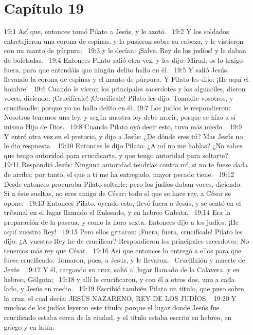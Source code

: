 \section*{Capítulo 19 }

19:1 Así que, entonces tomó Pilato a Jesús, y le azotó.  
19:2 Y los soldados entretejieron una corona de espinas, y la pusieron sobre su cabeza, y le vistieron con un manto de púrpura;  
19:3 y le decían: ¡Salve, Rey de los judíos! y le daban de bofetadas.  
19:4 Entonces Pilato salió otra vez, y les dijo: Mirad, os lo traigo fuera, para que entendáis que ningún delito hallo en él.  
19:5 Y salió Jesús, llevando la corona de espinas y el manto de púrpura. Y Pilato les dijo: ¡He aquí el hombre!  
19:6 Cuando le vieron los principales sacerdotes y los alguaciles, dieron voces, diciendo: ¡Crucifícale! ¡Crucifícale! Pilato les dijo: Tomadle vosotros, y crucificadle; porque yo no hallo delito en él. 
19:7 Los judíos le respondieron: Nosotros tenemos una ley, y según nuestra ley debe morir, porque se hizo a sí mismo Hijo de Dios.  
19:8 Cuando Pilato oyó decir esto, tuvo más miedo.  
19:9 Y entró otra vez en el pretorio, y dijo a Jesús: ¿De dónde eres tú? Mas Jesús no le dio respuesta.  
19:10 Entonces le dijo Pilato: ¿A mí no me hablas? ¿No sabes que tengo autoridad para crucificarte, y que tengo autoridad para soltarte?  
19:11 Respondió Jesús: Ninguna autoridad tendrías contra mí, si no te fuese dada de arriba; por tanto, el que a ti me ha entregado, mayor pecado tiene.  
19:12 Desde entonces procuraba Pilato soltarle; pero los judíos daban voces, diciendo: Si a éste sueltas, no eres amigo de César; todo el que se hace rey, a César se opone.  
19:13 Entonces Pilato, oyendo esto, llevó fuera a Jesús, y se sentó en el tribunal en el lugar llamado el Enlosado, y en hebreo Gabata.  
19:14 Era la preparación de la pascua, y como la hora sexta. Entonces dijo a los judíos: ¡He aquí vuestro Rey!  
19:15 Pero ellos gritaron: ¡Fuera, fuera, crucifícale! Pilato les dijo: ¿A vuestro Rey he de crucificar? Respondieron los principales sacerdotes: No tenemos más rey que César.  
19:16 Así que entonces lo entregó a ellos para que fuese crucificado. Tomaron, pues, a Jesús, y le llevaron.  
Crucifixión y muerte de Jesús   
19:17 Y él, cargando su cruz, salió al lugar llamado de la Calavera, y en hebreo, Gólgota;  
19:18 y allí le crucificaron, y con él a otros dos, uno a cada lado, y Jesús en medio.  
19:19 Escribió también Pilato un título, que puso sobre la cruz, el cual decía: JESÚS NAZARENO, REY DE LOS JUDÍOS.  
19:20 Y muchos de los judíos leyeron este título; porque el lugar donde Jesús fue crucificado estaba cerca de la ciudad, y el título estaba escrito en hebreo, en griego y en latín.  
